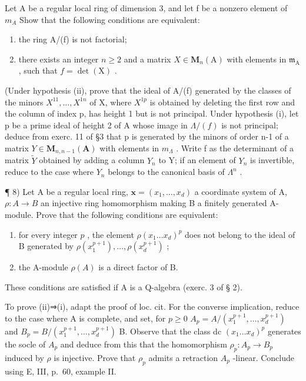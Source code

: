 Let A be a regular local ring of dimension 3, and let f be a nonzero element of \(m_{A}\) Show that the following conditions are equivalent:

\begin{enumerate}
\def\labelenumi{(\roman{enumi})}
\item
  the ring A/(f) is not factorial;
\item
  there exists an integer \(n \geqslant 2\) and a matrix \(X \in \mathbf{M}_n(\mathrm{A})\) with elements in \(\mathfrak{m}_{\mathrm{A}}\) , such that \(f = \det(\mathrm{X})\) .
\end{enumerate}

(Under hypothesis (ii), prove that the ideal of A/(f) generated by the classes of the minors \(X^{11}, \ldots, X^{1n}\) of X, where \(X^{1p}\) is obtained by deleting the first row and the column of index p, has height 1 but is not principal. Under hypothesis (i), let p be a prime ideal of height 2 of A whose image in \(\Lambda/(f)\) is not principal; deduce from exerc. 11 of §3 that p is generated by the minors of order n-1 of a matrix \(Y \in \mathbf{M}_{n,n-1}(\mathbf{A})\) with elements in \(m_{\Lambda}\) . Write f as the determinant of a matrix \(\widetilde{Y}\) obtained by adding a column \(Y_{n}\) to Y; if an element of \(Y_{n}\) is invertible, reduce to the case where \(Y_{n}\) belongs to the canonical basis of \(\Lambda^{n}\) .

¶ 8) Let A be a regular local ring, \(\mathbf{x} = (x_1, \ldots, x_d)\) a coordinate system of A, \(\rho : A \to B\) an injective ring homomorphism making B a finitely generated A-module. Prove that the following conditions are equivalent:

\begin{enumerate}
\def\labelenumi{(\roman{enumi})}
\item
  for every integer \(p\) , the element \(\rho(x_1 \ldots x_d)^p\) does not belong to the ideal of B generated by \(\rho(x_1^{p+1}), \ldots, \rho(x_d^{p+1})\) ;
\item
  the A-module \(\rho(A)\) is a direct factor of B.
\end{enumerate}

These conditions are satisfied if A is a Q-algebra (exerc. 3 of § 2).

To prove (ii)⇒(i), adapt the proof of loc. cit. For the converse implication, reduce to the case where A is complete, and set, for \(p \geqslant 0\) \(A_{p} = A/(x_{1}^{p+1}, \ldots, x_{d}^{p+1})\) and \(B_{p} = B/(x_{1}^{p+1}, \ldots, x_{d}^{p+1})\) B. Observe that the class dc \((x_{1} \ldots x_{d})^{p}\) generates the socle of \(A_{p}\) and deduce from this that the homomorphism \(\rho_{p}: A_{p} \to B_{p}\) induced by \(\rho\) is injective. Prove that \(\rho_{p}\) admits a retraction \(A_{p}\) -linear. Conclude using E, III, p.~60, example II.


